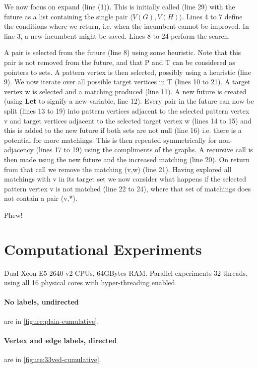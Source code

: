 \documentclass[letterpaper]{article}
\begin{document}
\bigskip
\noindent
We now focus on expand (line (1)). This is initially called (line 29) with the future as a list containing the single pair $\langle V(G),V(H) \rangle$. Lines 4 to 7 define the conditions 
where we return, i.e. when the incumbent cannot be improved. In line 3, a new incumbent might be saved. Lines 8 to 24 perform the search.

\bigskip
\noindent
A pair is selected from the future (line 8) using some heuristic. Note that this pair is not removed from the future, and that P and T can be considered as pointers to sets. A pattern vertex is then selected, possibly using a heuristic (line 9). We now iterate over all possible target vertices in T (lines 10 to 21). A target vertex w is selected and a matching produced (line 11). A new future is created (using {\bf Let} to signify a new variable, line 12). Every pair in the future can now be split (lines 13 to 19) into pattern vertices adjacent to the selected pattern vertex v and target vertices adjacent to the selected target vertex w (lines 14 to 15) and this is added to the new future if both sets are not null (line 16) i.e. there is a potential for more matchings. This is then repeated symmetrically for non-adjacency (lines 17 to 19) using the compliments of the graphs.
A recursive call is then made using the new future and the increased matching (line 20). On return from that call we remove the matching (v,w) (line 21). Having explored all matchings with v in its target set we now consider what happens if the selected pattern vertex v is not matched (line 22 to 24), where that set of matchings does not contain a pair (v,*).

\bigskip
\bigskip
\bigskip
\bigskip
\noindent
Phew!



\section{Computational Experiments}

Dual Xeon E5-2640 v2 CPUs, 64GBytes RAM. Parallel experiments 32 threads, using
all 16 physical cores with hyper-threading enabled.

\paragraph{No labels, undirected} are in \cref{figure:plain-cumulative}.

\paragraph{Vertex and edge labels, directed} are in \cref{figure:33ved-cumulative}.
\end{document}
